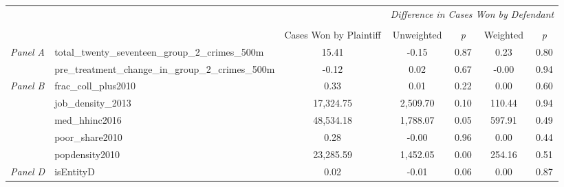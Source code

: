 \begin{tabular}{llccccc}
\toprule
 &  & \textit{} & \multicolumn{4}{c}{\textit{Difference in Cases Won by Defendant}} \\
\cline{4-7}
\\
 &  & Cases Won by Plaintiff & Unweighted & \emph{p} & Weighted & \emph{p} \\
\midrule
\multirow[c]{2}{3cm}{\textit{Panel A}} & total_twenty_seventeen_group_2_crimes_500m & 15.41 & -0.15 & 0.87 & 0.23 & 0.80 \\
 & pre_treatment_change_in_group_2_crimes_500m & -0.12 & 0.02 & 0.67 & -0.00 & 0.94 \\
\cline{1-7}
\multirow[c]{5}{3cm}{\textit{Panel B}} & frac_coll_plus2010 & 0.33 & 0.01 & 0.22 & 0.00 & 0.60 \\
 & job_density_2013 & 17,324.75 & 2,509.70 & 0.10 & 110.44 & 0.94 \\
 & med_hhinc2016 & 48,534.18 & 1,788.07 & 0.05 & 597.91 & 0.49 \\
 & poor_share2010 & 0.28 & -0.00 & 0.96 & 0.00 & 0.44 \\
 & popdensity2010 & 23,285.59 & 1,452.05 & 0.00 & 254.16 & 0.51 \\
\cline{1-7}
\textit{Panel D} & isEntityD & 0.02 & -0.01 & 0.06 & 0.00 & 0.87 \\
\cline{1-7}
\bottomrule
\end{tabular}
